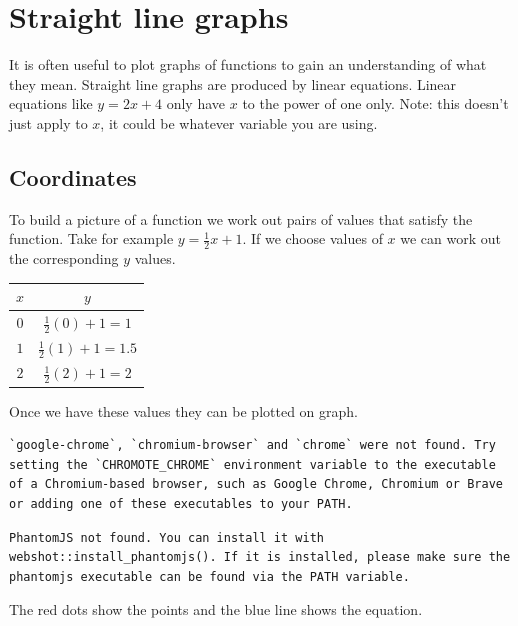 \documentclass[
  a4paper,
]{scrbook}
\newcounter{none} %
\begin{document}

\chapter{Straight line graphs}\label{straight-line-graphs}

It is often useful to plot graphs of functions to gain an understanding
of what they mean. Straight line graphs are produced by linear
equations. Linear equations like \(y=2x+4\) only have \(x\) to the power
of one only. Note: this doesn't just apply to \(x\), it could be
whatever variable you are using.

\section{Coordinates}\label{coordinates}

To build a picture of a function we work out pairs of values that
satisfy the function. Take for example \(y=\frac{1}{2}x+1\). If we
choose values of \(x\) we can work out the corresponding \(y\) values.

{\def\LTcaptype{none} %
\begin{longtable}[]{@{}cc@{}}
\toprule\noalign{}
\(x\) & \(y\) \\
\midrule\noalign{}
\endhead
\bottomrule\noalign{}
\endlastfoot
\(0\) & \(\frac{1}{2}(0)+1=1\) \\
\(1\) & \(\frac{1}{2}(1)+1=1.5\) \\
\(2\) & \(\frac{1}{2}(2)+1=2\) \\
\end{longtable}
}

Once we have these values they can be plotted on graph.

\begin{verbatim}
`google-chrome`, `chromium-browser` and `chrome` were not found. Try setting the `CHROMOTE_CHROME` environment variable to the executable of a Chromium-based browser, such as Google Chrome, Chromium or Brave or adding one of these executables to your PATH.
\end{verbatim}

\begin{verbatim}
PhantomJS not found. You can install it with webshot::install_phantomjs(). If it is installed, please make sure the phantomjs executable can be found via the PATH variable.
\end{verbatim}

The red dots show the points and the blue line shows the equation.
\end{document}
